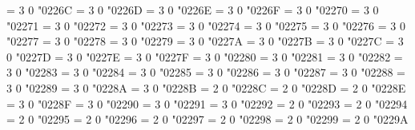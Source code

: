 \Umathchardef\between = 3 0 "0226C %
\Umathchardef\nasymp = 3 0 "0226D %
\Umathchardef\nless = 3 0 "0226E %
\Umathchardef\ngtr = 3 0 "0226F %
\Umathchardef\nleq = 3 0 "02270 %
\Umathchardef\ngeq = 3 0 "02271 %
\Umathchardef\lesssim = 3 0 "02272 %
\Umathchardef\gtrsim = 3 0 "02273 %
\Umathchardef\nlesssim = 3 0 "02274 %
\Umathchardef\ngtrsim = 3 0 "02275 %
\Umathchardef\lessgtr = 3 0 "02276 %
\Umathchardef\gtrless = 3 0 "02277 %
\Umathchardef\nlessgtr = 3 0 "02278 %
\Umathchardef\ngtrless = 3 0 "02279 %
\Umathchardef\prec = 3 0 "0227A %
\Umathchardef\succ = 3 0 "0227B %
\Umathchardef\preccurlyeq = 3 0 "0227C %
\Umathchardef\succcurlyeq = 3 0 "0227D %
\Umathchardef\precsim = 3 0 "0227E %
\Umathchardef\succsim = 3 0 "0227F %
\Umathchardef\nprec = 3 0 "02280 %
\Umathchardef\nsucc = 3 0 "02281 %
\Umathchardef\subset = 3 0 "02282 %
\Umathchardef\supset = 3 0 "02283 %
\Umathchardef\nsubset = 3 0 "02284 %
\Umathchardef\nsupset = 3 0 "02285 %
\Umathchardef\subseteq = 3 0 "02286 %
\Umathchardef\supseteq = 3 0 "02287 %
\Umathchardef\nsubseteq = 3 0 "02288 %
\Umathchardef\nsupseteq = 3 0 "02289 %
\Umathchardef\subsetneq = 3 0 "0228A %
\Umathchardef\supsetneq = 3 0 "0228B %
\Umathchardef\cupleftarrow = 2 0 "0228C %
\Umathchardef\cupdot = 2 0 "0228D %
\Umathchardef\uplus = 2 0 "0228E %
\Umathchardef\sqsubset = 3 0 "0228F %
\Umathchardef\sqsupset = 3 0 "02290 %
\Umathchardef\sqsubseteq = 3 0 "02291 %
\Umathchardef\sqsupseteq = 3 0 "02292 %
\Umathchardef\sqcap = 2 0 "02293 %
\Umathchardef\sqcup = 2 0 "02294 %
\Umathchardef\oplus = 2 0 "02295 %
\Umathchardef\ominus = 2 0 "02296 %
\Umathchardef\otimes = 2 0 "02297 %
\Umathchardef\oslash = 2 0 "02298 %
\Umathchardef\odot = 2 0 "02299 %
\Umathchardef\circledcirc = 2 0 "0229A %
